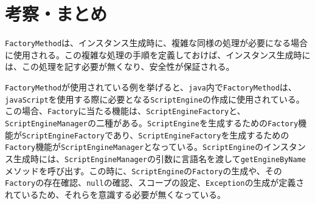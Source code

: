\documentclass[uplatex]{jsarticle}
\begin{document}
\section{考察・まとめ}
{\tt FactoryMethod}は、インスタンス生成時に、複雑な同様の処理が必要になる場合に使用される。この複雑な処理の手順を定義しておけば、インスタンス生成時には、この処理を記す必要が無くなり、安全性が保証される。


{\tt FactoryMethod}が使用されている例を挙げると、{\tt java}内で{\tt FactoryMethod}は、{\tt javaScript}を使用する際に必要となる{\tt ScriptEngine}の作成に使用されている。この場合、{\tt Factory}に当たる機能は、{\tt ScriptEngineFactory}と、{\tt ScriptEngineManager}の二種がある。{\tt ScriptEngine}を生成するための{\tt Factory}機能が{\tt ScriptEngineFactory}であり、{\tt ScriptEngineFactory}を生成するための{\tt Factory}機能が{\tt ScriptEngineManager}となっている。{\tt ScriptEngine}のインスタンス生成時には、{\tt ScriptEngineManager}の引数に言語名を渡して{\tt getEngineByName}メソッドを呼び出す。この時に、{\tt ScriptEngine}の{\tt Factory}の生成や、その{\tt Factory}の存在確認、{\tt null}の確認、スコープの設定、{\tt Exception}の生成が定義されているため、それらを意識する必要が無くなっている。

\end{document}
